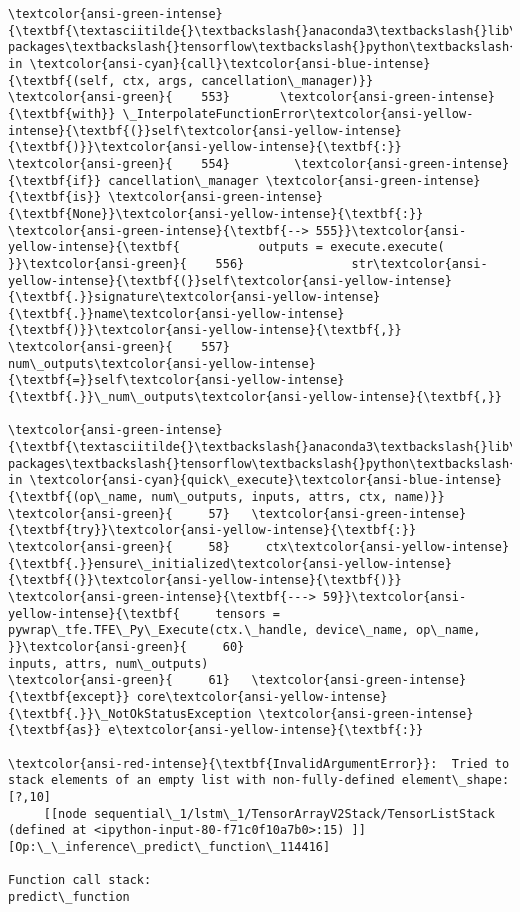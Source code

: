 \documentclass[11pt]{article}
\begin{document}
\begin{Verbatim}[commandchars=\\\{\}, frame=single, framerule=2mm, rulecolor=\color{outerrorbackground}]
\textcolor{ansi-green-intense}{\textbf{\textasciitilde{}\textbackslash{}anaconda3\textbackslash{}lib\textbackslash{}site-packages\textbackslash{}tensorflow\textbackslash{}python\textbackslash{}eager\textbackslash{}function.py}} in \textcolor{ansi-cyan}{call}\textcolor{ansi-blue-intense}{\textbf{(self, ctx, args, cancellation\_manager)}}
\textcolor{ansi-green}{    553}       \textcolor{ansi-green-intense}{\textbf{with}} \_InterpolateFunctionError\textcolor{ansi-yellow-intense}{\textbf{(}}self\textcolor{ansi-yellow-intense}{\textbf{)}}\textcolor{ansi-yellow-intense}{\textbf{:}}
\textcolor{ansi-green}{    554}         \textcolor{ansi-green-intense}{\textbf{if}} cancellation\_manager \textcolor{ansi-green-intense}{\textbf{is}} \textcolor{ansi-green-intense}{\textbf{None}}\textcolor{ansi-yellow-intense}{\textbf{:}}
\textcolor{ansi-green-intense}{\textbf{--> 555}}\textcolor{ansi-yellow-intense}{\textbf{           outputs = execute.execute(
}}\textcolor{ansi-green}{    556}               str\textcolor{ansi-yellow-intense}{\textbf{(}}self\textcolor{ansi-yellow-intense}{\textbf{.}}signature\textcolor{ansi-yellow-intense}{\textbf{.}}name\textcolor{ansi-yellow-intense}{\textbf{)}}\textcolor{ansi-yellow-intense}{\textbf{,}}
\textcolor{ansi-green}{    557}               num\_outputs\textcolor{ansi-yellow-intense}{\textbf{=}}self\textcolor{ansi-yellow-intense}{\textbf{.}}\_num\_outputs\textcolor{ansi-yellow-intense}{\textbf{,}}

\textcolor{ansi-green-intense}{\textbf{\textasciitilde{}\textbackslash{}anaconda3\textbackslash{}lib\textbackslash{}site-packages\textbackslash{}tensorflow\textbackslash{}python\textbackslash{}eager\textbackslash{}execute.py}} in \textcolor{ansi-cyan}{quick\_execute}\textcolor{ansi-blue-intense}{\textbf{(op\_name, num\_outputs, inputs, attrs, ctx, name)}}
\textcolor{ansi-green}{     57}   \textcolor{ansi-green-intense}{\textbf{try}}\textcolor{ansi-yellow-intense}{\textbf{:}}
\textcolor{ansi-green}{     58}     ctx\textcolor{ansi-yellow-intense}{\textbf{.}}ensure\_initialized\textcolor{ansi-yellow-intense}{\textbf{(}}\textcolor{ansi-yellow-intense}{\textbf{)}}
\textcolor{ansi-green-intense}{\textbf{---> 59}}\textcolor{ansi-yellow-intense}{\textbf{     tensors = pywrap\_tfe.TFE\_Py\_Execute(ctx.\_handle, device\_name, op\_name,
}}\textcolor{ansi-green}{     60}                                         inputs, attrs, num\_outputs)
\textcolor{ansi-green}{     61}   \textcolor{ansi-green-intense}{\textbf{except}} core\textcolor{ansi-yellow-intense}{\textbf{.}}\_NotOkStatusException \textcolor{ansi-green-intense}{\textbf{as}} e\textcolor{ansi-yellow-intense}{\textbf{:}}

\textcolor{ansi-red-intense}{\textbf{InvalidArgumentError}}:  Tried to stack elements of an empty list with non-fully-defined element\_shape: [?,10]
	 [[node sequential\_1/lstm\_1/TensorArrayV2Stack/TensorListStack (defined at <ipython-input-80-f71c0f10a7b0>:15) ]] [Op:\_\_inference\_predict\_function\_114416]

Function call stack:
predict\_function

    \end{Verbatim}
\end{document}
